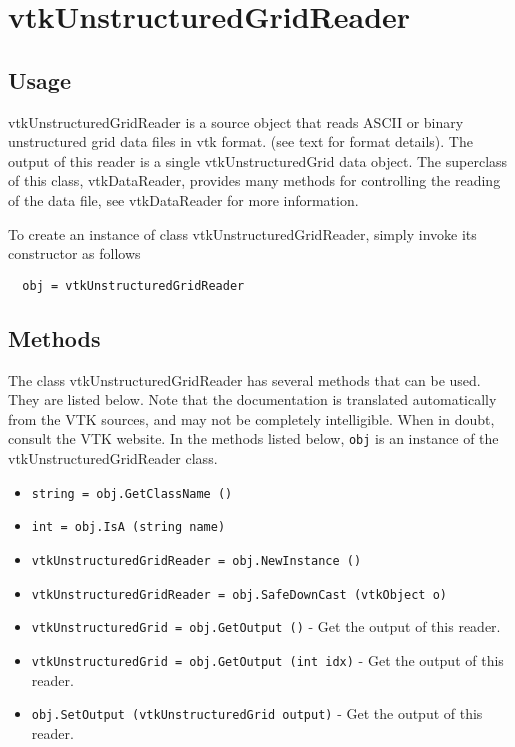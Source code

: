 \section{vtkUnstructuredGridReader}

\subsection{Usage}

 vtkUnstructuredGridReader is a source object that reads ASCII or binary 
 unstructured grid data files in vtk format. (see text for format details).
 The output of this reader is a single vtkUnstructuredGrid data object.
 The superclass of this class, vtkDataReader, provides many methods for
 controlling the reading of the data file, see vtkDataReader for more
 information.

To create an instance of class vtkUnstructuredGridReader, simply
invoke its constructor as follows
\begin{verbatim}
  obj = vtkUnstructuredGridReader
\end{verbatim}
\subsection{Methods}

The class vtkUnstructuredGridReader has several methods that can be used.
  They are listed below.
Note that the documentation is translated automatically from the VTK sources,
and may not be completely intelligible.  When in doubt, consult the VTK website.
In the methods listed below, \verb|obj| is an instance of the vtkUnstructuredGridReader class.
\begin{itemize}
\item  \verb|string = obj.GetClassName ()|

\item  \verb|int = obj.IsA (string name)|

\item  \verb|vtkUnstructuredGridReader = obj.NewInstance ()|

\item  \verb|vtkUnstructuredGridReader = obj.SafeDownCast (vtkObject o)|

\item  \verb|vtkUnstructuredGrid = obj.GetOutput ()| -  Get the output of this reader.

\item  \verb|vtkUnstructuredGrid = obj.GetOutput (int idx)| -  Get the output of this reader.

\item  \verb|obj.SetOutput (vtkUnstructuredGrid output)| -  Get the output of this reader.

\end{itemize}
